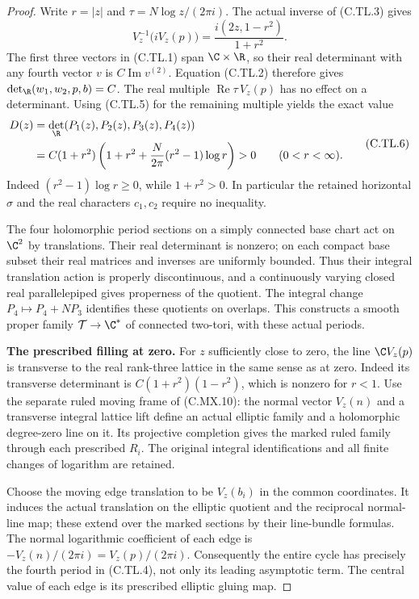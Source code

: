 \begin{proof}
Write $r=|z|$ and $\tau=N\log z/(2\pi i)$. The actual inverse
of (C.TL.3) gives
\[
 V_z^{-1}\bigl(iV_z(p)\bigr)
       =\frac{i(2z,1-r^2)}{1+r^2}.
 \tag{C.TL.5}
\]
The first three vectors in (C.TL.1) span $\C\times\R$, so
their real determinant with any fourth vector $v$ is
$C\operatorname{Im}v^{(2)}$. Equation (C.TL.2) therefore gives
$\det_{\R}(w_1,w_2,p,b)=C$. The real multiple
$\operatorname{Re}\tau\,V_z(p)$ has no effect on a determinant.
Using (C.TL.5) for the remaining multiple yields the exact value
\[
 \begin{aligned}
 D(z)&=\det_{\R}(P_1(z),P_2(z),P_3(z),P_4(z))\\
 &=C(1+r^2)
       \left(1+r^2+\frac{N}{2\pi}(r^2-1)\log r\right)>0
                         \qquad (0<r<\infty).
 \end{aligned}
 \tag{C.TL.6}
\]
Indeed $(r^2-1)\log r\geq0$, while $1+r^2>0$.
In particular the retained horizontal $\sigma$ and the real
characters $c_1,c_2$ require no inequality.

The four holomorphic period sections on a simply connected
base chart act on $\C^2$ by translations. Their real determinant
is nonzero; on each compact base subset their real matrices and
inverses are uniformly bounded. Thus their integral translation
action is properly discontinuous, and a continuously varying
closed real parallelepiped gives properness of the quotient.
The integral change $P_4\mapsto P_4+NP_3$ identifies these
quotients on overlaps. This constructs a smooth proper family
$\mathcal T\to\C^*$ of connected two-tori, with these actual
periods.

\par\medskip\noindent\textbf{The prescribed filling at zero.}
For $z$ sufficiently close to zero, the line
$\C V_z(p)$ is transverse to the real rank-three lattice in
the same sense as at zero. Indeed its transverse determinant
is $C(1+r^2)(1-r^2)$, which is nonzero for $r<1$.
Use the separate ruled moving frame of (C.MX.10):
the normal vector $V_z(n)$ and a transverse integral lattice
lift define an actual elliptic family and a holomorphic
degree-zero line on it. Its projective completion gives the
marked ruled family through each prescribed $R_i$.
The original integral identifications and all finite changes
of logarithm are retained.

Choose the moving edge translation to be $V_z(b_i)$ in the
common coordinates. It induces the actual translation on the
elliptic quotient and the reciprocal normal-line map; these
extend over the marked sections by their line-bundle formulas.
The normal logarithmic coefficient of each edge is
$-V_z(n)/(2\pi i)=V_z(p)/(2\pi i)$. Consequently the entire
cycle has precisely the fourth period in (C.TL.4), not only
its leading asymptotic term. The central value of each edge
is its prescribed elliptic gluing map.


\end{proof}
